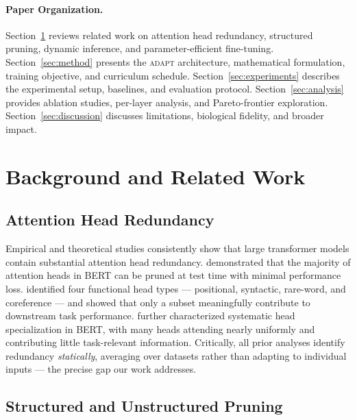 \documentclass{article}
\newcommand{\system}{\textsc{adapt}}
\begin{document}
\paragraph{Paper Organization.}
Section~\ref{sec:background} reviews related work on attention head redundancy, structured
pruning, dynamic inference, and parameter-efficient fine-tuning. Section~\ref{sec:method}
presents the \system{} architecture, mathematical formulation, training objective, and
curriculum schedule. Section~\ref{sec:experiments} describes the experimental setup,
baselines, and evaluation protocol. Section~\ref{sec:analysis} provides ablation studies,
per-layer analysis, and Pareto-frontier exploration. Section~\ref{sec:discussion} discusses
limitations, biological fidelity, and broader impact.

\section{Background and Related Work}
\label{sec:background}

\subsection{Attention Head Redundancy}
\label{sec:bg_redundancy}

Empirical and theoretical studies consistently show that large transformer models contain
substantial attention head redundancy. \citet{michel2019sixteen} demonstrated that the majority
of attention heads in BERT can be pruned at test time with minimal performance loss.
\citet{voita2019analyzing} identified four functional head types --- positional, syntactic,
rare-word, and coreference --- and showed that only a subset meaningfully contribute to
downstream task performance. \citet{clark2019does} further characterized systematic head
specialization in BERT, with many heads attending nearly uniformly and contributing little
task-relevant information. Critically, all prior analyses identify redundancy \emph{statically},
averaging over datasets rather than adapting to individual inputs --- the precise gap our work
addresses.

\subsection{Structured and Unstructured Pruning}
\label{sec:bg_pruning}
\end{document}
